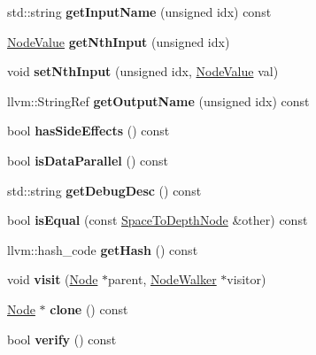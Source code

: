 \begin{DoxyCompactItemize}
std\+::string {\bfseries get\+Input\+Name} (unsigned idx) const
\item 
\mbox{\label{classglow_1_1_space_to_depth_node_a3a07d7853e74f9175bf16b707d52a05f}} 
\hyperlink{structglow_1_1_node_value}{Node\+Value} {\bfseries get\+Nth\+Input} (unsigned idx)
\item 
\mbox{\label{classglow_1_1_space_to_depth_node_af2de035785bb8527532b7362bcd8aa65}} 
void {\bfseries set\+Nth\+Input} (unsigned idx, \hyperlink{structglow_1_1_node_value}{Node\+Value} val)
\item 
\mbox{\label{classglow_1_1_space_to_depth_node_ae6375c80fec8d95ac1ffa66adda88bad}} 
llvm\+::\+String\+Ref {\bfseries get\+Output\+Name} (unsigned idx) const
\item 
\mbox{\label{classglow_1_1_space_to_depth_node_a4f6d554ce8843b80846968e9b602b08e}} 
bool {\bfseries has\+Side\+Effects} () const
\item 
\mbox{\label{classglow_1_1_space_to_depth_node_aa47898481f9cd8c710a75bd5c84b0f7f}} 
bool {\bfseries is\+Data\+Parallel} () const
\item 
\mbox{\label{classglow_1_1_space_to_depth_node_a1ab2168f28d49a5c16e9b3c2c18bab93}} 
std\+::string {\bfseries get\+Debug\+Desc} () const
\item 
\mbox{\label{classglow_1_1_space_to_depth_node_a025ce39e1c60269acd4d34756e2114b3}} 
bool {\bfseries is\+Equal} (const \hyperlink{classglow_1_1_space_to_depth_node}{Space\+To\+Depth\+Node} \&other) const
\item 
\mbox{\label{classglow_1_1_space_to_depth_node_a31ae915c16bda26ab6be7e7b4965d002}} 
llvm\+::hash\+\_\+code {\bfseries get\+Hash} () const
\item 
\mbox{\label{classglow_1_1_space_to_depth_node_a66b7f8a8988b5db5a079553ab50b81ce}} 
void {\bfseries visit} (\hyperlink{classglow_1_1_node}{Node} $\ast$parent, \hyperlink{classglow_1_1_node_walker}{Node\+Walker} $\ast$visitor)
\item 
\mbox{\label{classglow_1_1_space_to_depth_node_a4294b7ba276e779a11caf267196581c0}} 
\hyperlink{classglow_1_1_node}{Node} $\ast$ {\bfseries clone} () const
\item 
\mbox{\label{classglow_1_1_space_to_depth_node_a87a85435f925eacffe85a4570255da50}} 
bool {\bfseries verify} () const
\end{DoxyCompactItemize}
